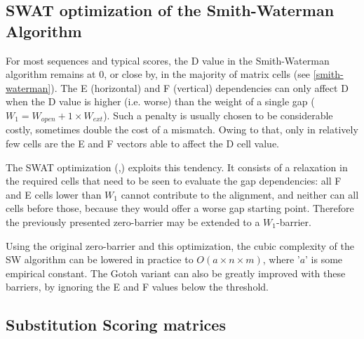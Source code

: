 \subsection{SWAT optimization of the Smith-Waterman Algorithm}
\label{SWAT optimization}


For most sequences and typical scores, the D value in the Smith-Waterman algorithm remains at 0, or close by, in the majority of matrix cells (see \autoref{smith-waterman}). The E (horizontal) and F (vertical) dependencies can only affect D when the D value is higher (i.e. worse) than the weight of a single gap ($W_1 = W_{open} + 1 \times W_{ext}$). Such a penalty is usually chosen to be considerable costly, sometimes double the cost of a mismatch. Owing to that, only in relatively few cells are the E and F vectors able to affect the D cell value.

The SWAT optimization (\cite{swat},\cite{ssearch}) exploits this tendency. It consists of a relaxation in the required cells that need to be seen to evaluate the gap dependencies: all F and E cells lower than $W_1$ cannot contribute to the alignment, and neither can all cells before those, because they would offer a worse gap starting point. Therefore the previously presented zero-barrier may be extended to a $W_1$-barrier.

Using the original zero-barrier and this optimization, the cubic complexity of the \ac{SW} algorithm can be lowered in practice to $O(a \times n \times m)$, where '$a$' is some empirical constant. The Gotoh variant can also be greatly improved with these barriers, by ignoring the E and F values below the threshold.



\subsection{Substitution Scoring matrices}
\label{Substitution Scoring matrices}


